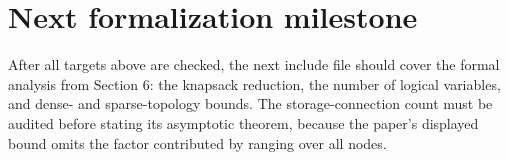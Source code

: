 \section*{Next formalization milestone}

After all targets above are checked, the next include file should cover the
formal analysis from Section 6: the knapsack reduction, the number of logical
variables, and dense- and sparse-topology bounds. The storage-connection count
must be audited before stating its asymptotic theorem, because the paper's
displayed bound omits the factor contributed by ranging over all nodes.
